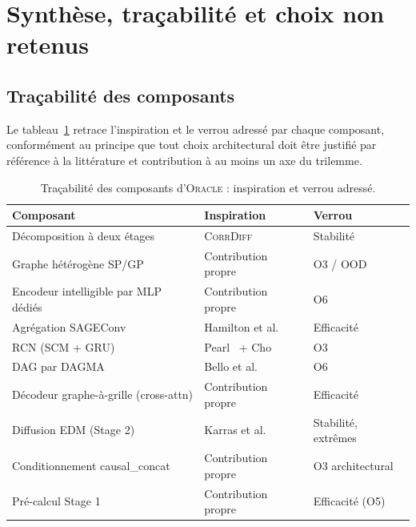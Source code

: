 \documentclass[14pt,a4paper,openany]{extreport}
\theoremstyle{definition}
\newcommand{\Oracle}{\textsc{Oracle}}
\newcommand{\CorrDiff}{\textsc{CorrDiff}}
\begin{document}
\section{Synthèse, traçabilité et choix non retenus}
\label{sec:oracle-synthese}

\subsection{Traçabilité des composants}
\label{ssec:oracle-tab-tracabilite}

Le tableau~\ref{tab:tracabilite} retrace l'inspiration et le verrou adressé par chaque composant, conformément au principe que tout choix architectural doit être justifié par référence à la littérature et contribution à au moins un axe du trilemme.

\begin{table}[ht]
  \centering
  \small
  \caption{Traçabilité des composants d'\Oracle{} : inspiration et verrou adressé.}
  \label{tab:tracabilite}
  \begin{tabularx}{\linewidth}{l X l}
    \toprule
    \textbf{Composant} & \textbf{Inspiration} & \textbf{Verrou} \\
    \midrule
    Décomposition à deux étages & \CorrDiff{}~\cite{mardani_corrdiff_2023} & Stabilité\\
    Graphe hétérogène SP/GP & Contribution propre & O3 / OOD\\
    Encodeur intelligible par MLP dédiés & Contribution propre & O6\\
    Agrégation SAGEConv & Hamilton et al.~\cite{hamilton_sage_2017} & Efficacité\\
    RCN (SCM + GRU) & Pearl~\cite{pearl_causality_2009} + Cho~\cite{cho_gru_2014} & O3\\
    DAG par DAGMA & Bello et al.~\cite{bello_dagma_2022} & O6\\
    Décodeur graphe-à-grille (cross-attn) & Contribution propre & Efficacité\\
    Diffusion EDM (Stage 2) & Karras et al.~\cite{karras_edm_2022} & Stabilité, extrêmes\\
    Conditionnement causal\_concat & Contribution propre & O3 architectural\\
    Pré-calcul Stage 1 & Contribution propre & Efficacité (O5)\\
    \bottomrule
  \end{tabularx}
\end{table}
\end{document}
